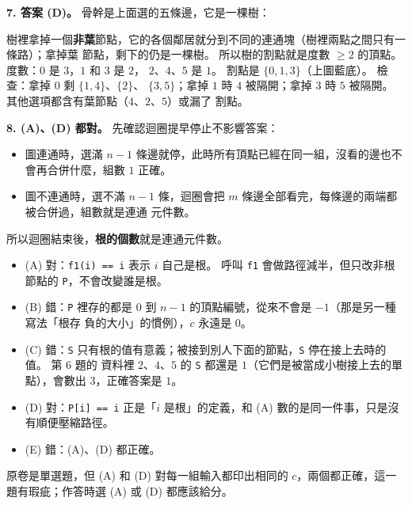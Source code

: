 \begin{pastsoln}
\textbf{7. 答案 (D)。} 骨幹是上面選的五條邊，它是一棵樹：
\begin{center}
\end{center}
樹裡拿掉一個\textbf{非葉}節點，它的各個鄰居就分到不同的連通塊（樹裡兩點之間只有一條路）；拿掉葉
節點，剩下的仍是一棵樹。 所以樹的割點就是度數 $\ge 2$ 的頂點。 度數：$0$ 是 $3$，$1$ 和 $3$ 是 $2$，
$2$、$4$、$5$ 是 $1$。 割點是 $\{0, 1, 3\}$（上圖藍底）。 檢查：拿掉 $0$ 剩 $\{1,4\}$、$\{2\}$、
$\{3,5\}$；拿掉 $1$ 時 $4$ 被隔開；拿掉 $3$ 時 $5$ 被隔開。 其他選項都含有葉節點（$4$、$2$、$5$）或漏了
割點。

\textbf{8. (A)、(D) 都對。} 先確認迴圈提早停止不影響答案：
\begin{itemize}
\item 圖連通時，選滿 $n - 1$ 條邊就停，此時所有頂點已經在同一組，沒看的邊也不會再合併什麼，組數 $1$
正確。
\item 圖不連通時，選不滿 $n - 1$ 條，迴圈會把 $m$ 條邊全部看完，每條邊的兩端都被合併過，組數就是連通
元件數。
\end{itemize}
所以迴圈結束後，\textbf{根的個數}就是連通元件數。
\begin{itemize}
\item (A) 對：\texttt{f1(i) == i} 表示 $i$ 自己是根。 呼叫 \texttt{f1} 會做路徑減半，但只改非根節點的
\texttt{P}，不會改變誰是根。
\item (B) 錯：\texttt{P} 裡存的都是 $0$ 到 $n-1$ 的頂點編號，從來不會是 $-1$（那是另一種寫法「根存
負的大小」的慣例），$c$ 永遠是 $0$。
\item (C) 錯：\texttt{S} 只有根的值有意義；被接到別人下面的節點，\texttt{S} 停在接上去時的值。 第 6 題的
資料裡 $2$、$4$、$5$ 的 \texttt{S} 都還是 $1$（它們是被當成小樹接上去的單點），會數出 $3$，正確答案是 $1$。
\item (D) 對：\texttt{P[i] == i} 正是「$i$ 是根」的定義，和 (A) 數的是同一件事，只是沒有順便壓縮路徑。
\item (E) 錯：(A)、(D) 都正確。
\end{itemize}
原卷是單選題，但 (A) 和 (D) 對每一組輸入都印出相同的 $c$，兩個都正確，這一題有瑕疵；作答時選 (A) 或 (D)
都應該給分。
\end{pastsoln}
